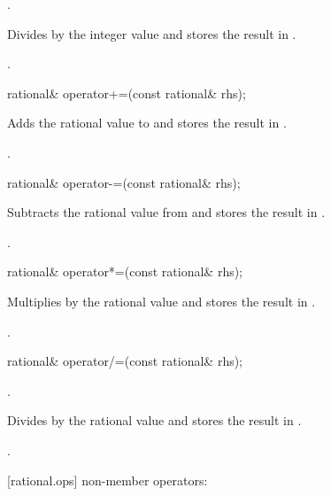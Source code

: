 \begin{itemdescr}
\requires {}.
    
\effects Divides  by the integer value  and stores the result in .

\returns {}.
\end{itemdescr}

\begin{itemdecl}
rational& operator+=(const rational& rhs);
\end{itemdecl}

\begin{itemdescr}
\effects Adds the rational value  to  and stores the result in .

\returns {}.
\end{itemdescr}

\begin{itemdecl}
rational& operator-=(const rational& rhs);
\end{itemdecl}

\begin{itemdescr}
\effects Subtracts the rational value  from  and stores the result in .

\returns {}.
\end{itemdescr}

\begin{itemdecl}
rational& operator*=(const rational& rhs);
\end{itemdecl}

\begin{itemdescr}
\effects Multiplies  by the rational value  and stores the result in .

\returns {}.
\end{itemdescr}

\begin{itemdecl}
rational& operator/=(const rational& rhs);
\end{itemdecl}

\begin{itemdescr}
\requires {}.    
    
\effects Divides  by the rational value  and stores the result in .

\returns {}.
\end{itemdescr}

[rational.ops]{ non-member operators:}

